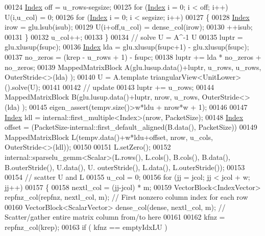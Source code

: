 \begin{DoxyCode}
00124         \hyperlink{namespace_eigen_a62e77e0933482dafde8fe197d9a2cfde}{Index} off = u\_rows-segsize;
00125         \textcolor{keywordflow}{for} (\hyperlink{namespace_eigen_a62e77e0933482dafde8fe197d9a2cfde}{Index} i = 0; i < off; i++) U(i,u\_col) = 0;
00126         \textcolor{keywordflow}{for} (\hyperlink{namespace_eigen_a62e77e0933482dafde8fe197d9a2cfde}{Index} i = 0; i < segsize; i++)
00127         \{
00128           \hyperlink{namespace_eigen_a62e77e0933482dafde8fe197d9a2cfde}{Index} irow = glu.lsub(isub); 
00129           U(i+off,u\_col) = dense\_col(irow); 
00130           ++isub; 
00131         \}
00132         u\_col++;
00133       \}
00134       \textcolor{comment}{// solve U = A^-1 U}
00135       luptr = glu.xlusup(fsupc);
00136       \hyperlink{namespace_eigen_a62e77e0933482dafde8fe197d9a2cfde}{Index} lda = glu.xlusup(fsupc+1) - glu.xlusup(fsupc);
00137       no\_zeros = (krep - u\_rows + 1) - fsupc;
00138       luptr += lda * no\_zeros + no\_zeros;
00139       MappedMatrixBlock A(glu.lusup.data()+luptr, u\_rows, u\_rows, OuterStride<>(lda) );
00140       U = A.template triangularView<UnitLower>().solve(U);
00141       
00142       \textcolor{comment}{// update}
00143       luptr += u\_rows;
00144       MappedMatrixBlock B(glu.lusup.data()+luptr, nrow, u\_rows, OuterStride<>(lda) );
00145       eigen\_assert(tempv.size()>w*ldu + nrow*w + 1);
00146       
00147       \hyperlink{namespace_eigen_a62e77e0933482dafde8fe197d9a2cfde}{Index} ldl = internal::first\_multiple<Index>(nrow, PacketSize);
00148       \hyperlink{namespace_eigen_a62e77e0933482dafde8fe197d9a2cfde}{Index} offset = (PacketSize-internal::first\_default\_aligned(B.data(), PacketSize)) %
00149       MappedMatrixBlock L(tempv.data()+w*ldu+offset, nrow, u\_cols, OuterStride<>(ldl));
00150       
00151       L.setZero();
00152       internal::sparselu\_gemm<Scalar>(L.rows(), L.cols(), B.cols(), B.data(), B.outerStride(), U.data(), U.
      outerStride(), L.data(), L.outerStride());
00153       
00154       \textcolor{comment}{// scatter U and L}
00155       u\_col = 0;
00156       \textcolor{keywordflow}{for} (jj = jcol; jj < jcol + w; jj++)
00157       \{
00158         nextl\_col = (jj-jcol) * m; 
00159         VectorBlock<IndexVector> repfnz\_col(repfnz, nextl\_col, m); \textcolor{comment}{// First nonzero column index for each
       row}
00160         VectorBlock<ScalarVector> dense\_col(dense, nextl\_col, m); \textcolor{comment}{// Scatter/gather entire matrix column
       from/to here}
00161         
00162         kfnz = repfnz\_col(krep); 
00163         \textcolor{keywordflow}{if} ( kfnz == emptyIdxLU ) 

\end{DoxyCode}
